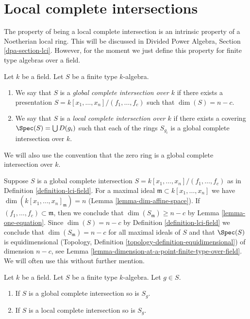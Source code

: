 \section{Local complete intersections}
\label{section-lci}

\noindent
The property of being a local complete intersection is an
intrinsic property of a Noetherian local ring.
This will be discussed in
Divided Power Algebra, Section \ref{dpa-section-lci}.
However, for the moment we just define this property for
finite type algebras over a field.

\begin{definition}
\label{definition-lci-field}
Let $k$ be a field.
Let $S$ be a finite type $k$-algebra.
\begin{enumerate}
\item We say that $S$ is a {\it global complete intersection over $k$}
if there exists a presentation $S = k[x_1, \ldots, x_n]/(f_1, \ldots, f_c)$
such that $\dim(S) = n - c$.
\item We say that $S$ is a {\it local complete intersection over $k$}
if there exists a covering $\Spec(S) = \bigcup D(g_i)$ such
that each of the rings $S_{g_i}$ is a global complete intersection
over $k$.
\end{enumerate}
We will also use the convention that the zero ring is a global
complete intersection over $k$.
\end{definition}

\noindent
Suppose $S$ is a global complete intersection
$S = k[x_1, \ldots, x_n]/(f_1, \ldots, f_c)$ as in
Definition \ref{definition-lci-field}.
For a maximal ideal $\mathfrak m \subset k[x_1, \ldots, x_n]$
we have $\dim(k[x_1, \ldots, x_n]_\mathfrak m) = n$
(Lemma \ref{lemma-dim-affine-space}).
If $(f_1, \ldots, f_c) \subset \mathfrak m$, then we
conclude that $\dim(S_\mathfrak m) \geq n - c$ by
Lemma \ref{lemma-one-equation}. Since $\dim(S) = n - c$
by Definition \ref{definition-lci-field} we conclude
that $\dim(S_\mathfrak m) = n - c$ for all maximal ideals of $S$
and that $\Spec(S)$ is equidimensional
(Topology, Definition \ref{topology-definition-equidimensional})
of dimension $n - c$, see
Lemma \ref{lemma-dimension-at-a-point-finite-type-over-field}.
We will often use this without further mention.

\begin{lemma}
\label{lemma-localize-lci}
Let $k$ be a field.
Let $S$ be a finite type $k$-algebra.
Let $g \in S$.
\begin{enumerate}
\item If $S$ is a global complete intersection so is $S_g$.
\item If $S$ is a local complete intersection so is $S_g$.
\end{enumerate}
\end{lemma}

